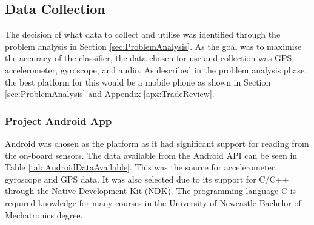 \documentclass{UoNMCHA}
\newcommand{\sref}[1] {Section \ref{#1}}
\newcommand{\tref}[1] {Table \ref{#1}}
\newcommand{\aref}[1] {Appendix \ref{#1}}
\numberwithin{equation}{section}
\begin{document}
\subsection{Data Collection}

The decision of what data to collect and utilise was identified through the problem analysis in \sref{sec:ProblemAnalysis}. As the goal was to maximise the accuracy of the classifier, the data chosen for use and collection was GPS, accelerometer, gyroscope, and audio. As described in the problem analysis phase, the best platform for this would be a mobile phone as shown in \sref{sec:ProblemAnalysis} and \aref{apx:TradeReview}. 

\subsubsection{Project Android App}
Android was chosen as the platform as it had significant support for reading from the on-board sensors. The data available from the Android API can be seen in \tref{tab:AndroidDataAvailable}. This was the source for accelerometer, gyroscope and GPS data. It was also selected due to its support for C/C++ through the Native Development Kit (NDK). The programming language C is required knowledge for many courses in the University of Newcastle Bachelor of Mechatronics degree. 
\end{document}
